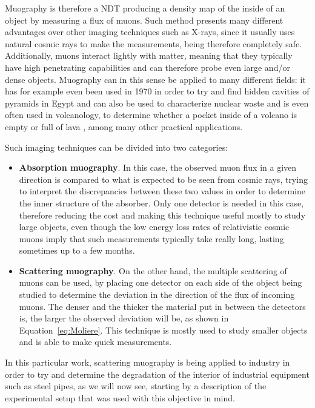 \documentclass[a4paper, 11pt, twoside, openright]{report}
\begin{document}
Muography is therefore a NDT producing a density map of the inside of an object by measuring a flux of muons. Such method presents many different advantages over other imaging techniques such as X-rays, since it usually uses natural cosmic rays to make the measurements, being therefore completely safe. Additionally, muons interact lightly with matter, meaning that they typically have high penetrating capabilities and can therefore probe even large and/or dense objects. Muography can in this sense be applied to many different fields: it has for example even been used in 1970 in order to try and find hidden cavities of pyramids in Egypt \cite{Egypt} and can also be used to characterize nuclear waste \cite{waste} and is even often used in volcanology, to determine whether a pocket inside of a volcano is empty or full of lava \cite{lava}, among many other practical applications. 

Such imaging techniques can be divided into two categories:
\begin{itemize}
\item \textbf{Absorption muography}. In this case, the observed muon flux in a given direction is compared to what is expected to be seen from cosmic rays, trying to interpret the discrepancies between these two values in order to determine the inner structure of the absorber. Only one detector is needed in this case, therefore reducing the cost and making this technique useful mostly to study large objects, even though the low energy loss rates of relativistic cosmic muons imply that such measurements typically take really long, lasting sometimes up to a few months.
\item \textbf{Scattering muography}. On the other hand, the multiple scattering of muons can be used, by placing one detector on each side of the object being studied to determine the deviation in the direction of the flux of incoming muons. The denser and the thicker the material put in between the detectors is, the larger the observed deviation will be, as shown in Equation~\ref{eq:Moliere}. This technique is mostly used to study smaller objects and is able to make quick measurements.
\end{itemize}

In this particular work, scattering muography is being applied to industry in order to try and determine the degradation of the interior of industrial equipment such as steel pipes, as we will now see, starting by a description of the experimental setup that was used with this objective in mind.
\end{document}
